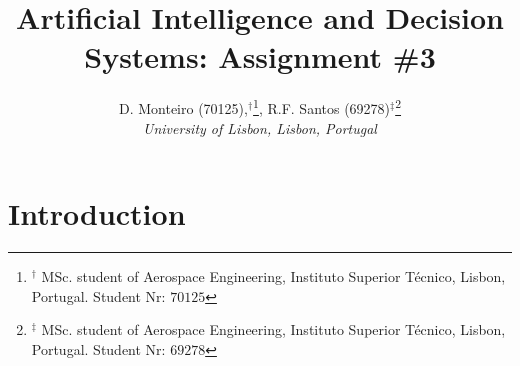 \documentclass[11pt,journal,compsoc]{IEEEtran}
\begin{document}
%
\title{Artificial Intelligence and Decision Systems: Assignment \#3}


\author{D. Monteiro (70125),$^\dagger$\thanks{$^\dagger$ MSc. student of Aerospace Engineering, Instituto Superior Técnico, Lisbon, Portugal. Student Nr: $70125$}, R.F. Santos (69278)$^\ddagger$\thanks{$^\ddagger$ MSc. student of Aerospace Engineering, Instituto Superior Técnico, Lisbon, Portugal. Student Nr: $69278$}\\[.2 cm]
\textit{University of Lisbon, Lisbon, Portugal}}%
     



\maketitle



%
\IEEEpeerreviewmaketitle

\section{Introduction}
\end{document}
